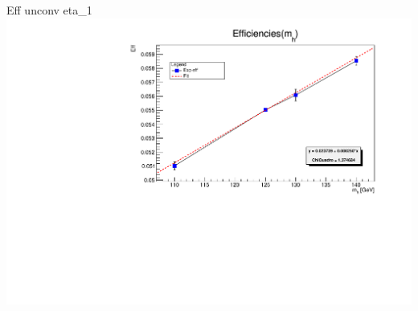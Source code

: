 \documentclass[10pt,UKenglish, leqno, xcolor = dvipsnames]{beamer}
\begin{document}
		\begin{frame}{Eff unconv eta\_1}
			\vfill
			\includegraphics[width=1.\textwidth]{../images/week_10/efficiencies_fit_unconv_eta_1.pdf}
			\vfill
		\end{frame}
	
\end{document}
